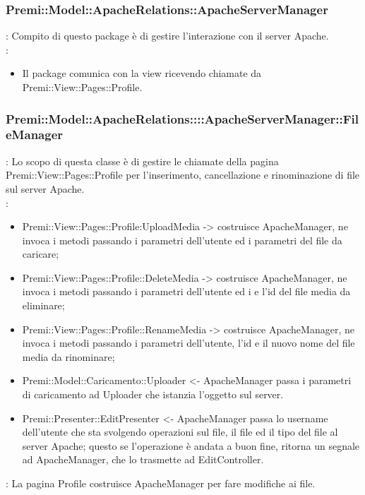 \subsubsection{Premi::Model::ApacheRelations::ApacheServerManager}{
		\textbf{\tipo}: Compito di questo package è di gestire l'interazione con il server Apache.\\
		\textbf{\relaz}:
		\begin{itemize}
			\item Il package comunica con la view ricevendo chiamate da Premi::View::Pages::Profile.
		\end{itemize}

			\subsubsection{Premi::Model::ApacheRelations::::ApacheServerManager::FileManager}{
			\textbf{\tipo}: Lo scopo di questa classe è di gestire le chiamate della pagina Premi::View::Pages::Profile per l'inserimento, cancellazione e rinominazione di file sul server Apache.\\
			\textbf{\relaz}:
			\begin{itemize}
			 	\item Premi::View::Pages::Profile:UploadMedia -> costruisce ApacheManager, ne invoca i metodi passando i parametri dell'utente ed i parametri del file da caricare; 
			 	\item Premi::View::Pages::Profile::DeleteMedia -> costruisce ApacheManager, ne invoca i metodi passando i parametri dell'utente ed i e l'id del file media da eliminare;
			 	\item Premi::View::Pages::Profile::RenameMedia -> costruisce ApacheManager, ne invoca i metodi passando i parametri dell'utente, l'id e il nuovo nome del file media da rinominare; 
			 	\item Premi::Model::Caricamento::Uploader <- ApacheManager passa i parametri di caricamento ad Uploader che istanzia l'oggetto sul server.
			 	\item Premi::Presenter::EditPresenter <- ApacheManager passa lo username dell'utente che sta svolgendo operazioni sul file, il file ed il tipo del file al server Apache; questo se l'operazione è andata a buon fine, ritorna un segnale ad ApacheManager, che lo trasmette ad EditController.
			\end{itemize}
		\textbf{\interfacce}: La pagina Profile costruisce ApacheManager per fare modifiche ai file. 
	}
}
	
